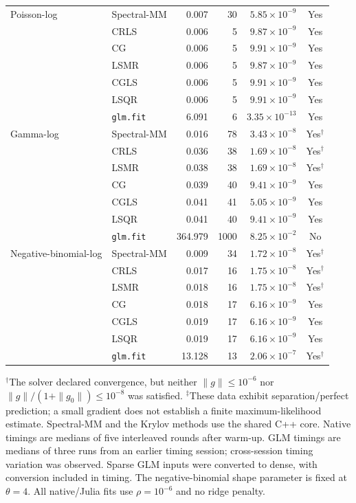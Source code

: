 \begin{table}[htbp]
\begin{tabular}{llrrrc}
Poisson-log
& Spectral-MM & 0.007 & 30 & $5.85\times10^{-9}$ & Yes \\
& CRLS & 0.006 & 5 & $9.87\times10^{-9}$ & Yes \\
& CG & 0.006 & 5 & $9.91\times10^{-9}$ & Yes \\
& LSMR & 0.006 & 5 & $9.87\times10^{-9}$ & Yes \\
& CGLS & 0.006 & 5 & $9.91\times10^{-9}$ & Yes \\
& LSQR & 0.006 & 5 & $9.91\times10^{-9}$ & Yes \\
& \texttt{glm.fit} & 6.091 & 6 & $3.35\times10^{-13}$ & Yes \\
\midrule

Gamma-log
& Spectral-MM & 0.016 & 78 & $3.43\times10^{-8}$ & Yes$^{\dagger}$ \\
& CRLS & 0.036 & 38 & $1.69\times10^{-8}$ & Yes$^{\dagger}$ \\
& LSMR & 0.038 & 38 & $1.69\times10^{-8}$ & Yes$^{\dagger}$ \\
& CG & 0.039 & 40 & $9.41\times10^{-9}$ & Yes \\
& CGLS & 0.041 & 41 & $5.05\times10^{-9}$ & Yes \\
& LSQR & 0.041 & 40 & $9.41\times10^{-9}$ & Yes \\
& \texttt{glm.fit} & 364.979 & 1000 & $8.25\times10^{-2}$ & No \\
\midrule

Negative-binomial-log
& Spectral-MM & 0.009 & 34 & $1.72\times10^{-8}$ & Yes$^{\dagger}$ \\
& CRLS & 0.017 & 16 & $1.75\times10^{-8}$ & Yes$^{\dagger}$ \\
& LSMR & 0.018 & 16 & $1.75\times10^{-8}$ & Yes$^{\dagger}$ \\
& CG & 0.018 & 17 & $6.16\times10^{-9}$ & Yes \\
& CGLS & 0.019 & 17 & $6.16\times10^{-9}$ & Yes \\
& LSQR & 0.019 & 17 & $6.16\times10^{-9}$ & Yes \\
& \texttt{glm.fit} & 13.128 & 13 & $2.06\times10^{-7}$ & Yes$^{\dagger}$ \\

\bottomrule
\end{tabular}
\par\smallskip
\begin{minipage}{\linewidth}
\footnotesize
$^{\dagger}$The solver declared convergence, but neither $\|g\|\leq 10^{-6}$ nor
$\|g\|/(1+\|g_0\|)\leq 10^{-8}$ was satisfied.
$^{\ddagger}$These data exhibit separation/perfect prediction; a small gradient does not establish a finite maximum-likelihood estimate.
Spectral-MM and the Krylov methods use the shared C++ core.
Native timings are medians of five interleaved rounds after warm-up.
GLM timings are medians of three runs from an earlier timing session;
cross-session timing variation was observed. Sparse GLM inputs were converted to dense, with conversion included in timing.
The negative-binomial shape parameter is fixed at $\theta=4$.
All native/Julia fits use $\rho=10^{-6}$ and no ridge penalty.
\end{minipage}
\end{table}

